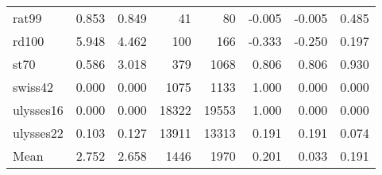 \begin{tabular}{lrrrrrrr}
    rat99 &     0.853 &     0.849 &          41 &          80 &  -0.005 &   -0.005 &         0.485 \\
    rd100 &     5.948 &     4.462 &         100 &         166 &  -0.333 &   -0.250 &         0.197 \\
     st70 &     0.586 &     3.018 &         379 &        1068 &   0.806 &    0.806 &         0.930 \\
  swiss42 &     0.000 &     0.000 &        1075 &        1133 &   1.000 &    0.000 &         0.000 \\
ulysses16 &     0.000 &     0.000 &       18322 &       19553 &   1.000 &    0.000 &         0.000 \\
ulysses22 &     0.103 &     0.127 &       13911 &       13313 &   0.191 &    0.191 &         0.074 \\
     Mean &     2.752 &     2.658 &        1446 &        1970 &   0.201 &    0.033 &         0.191 \\
\bottomrule
\end{tabular}
